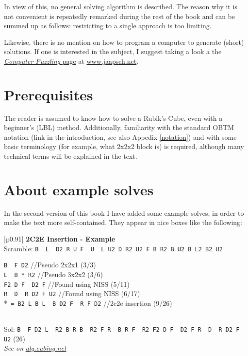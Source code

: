 \documentclass[11pt,a4paper]{book}
\newcommand{\p}{\textquotesingle}
\newcommand{\m}{\texttt}
\newcommand{\ps}{\p\,\,}
\newcommand{\comment}[1]{{\color{gray}\quad//#1}}
\begin{document}
In view of this, no general solving algorithm is described. The reason why it is not convenient is repeatedly remarked during the rest of the book and can be summed up as follows: restricting to a single approach is too limiting.

Likewise, there is no mention on how to program a computer to generate (short) solutions. If one is interested in the subject, I suggest taking a look a the \href{https://www.jaapsch.net/puzzles/compcube.htm}{\emph{Computer Puzzling} page} at \url{www.jaapsch.net}.

\section*{Prerequisites}

The reader is assumed to know how to solve a Rubik's Cube, even with a beginner's (LBL) method. Additionally, familiarity with the standard OBTM notation (link in the introduction, see also Appedix \ref{notation}) and with some basic terminology (for example, what 2x2x2 block is) is required, although many technical terms will be explained in the text.

\section*{About example solves}

In the second version of this book I have added some example solves, in order to make the text more self-contained. They appear in nice boxes like the following:

\bigskip
\begin{tabular}{|p{}|}
\hline
\textbf{2C2E Insertion - Example}\\
\hline
Scramble: \m{B\ps L\ps D2 R U F\ps U\ps L U2 D R2 U2 F B R2 B U2 B L2 B2 U2}\\
\hline
\begin{minipage}[l]{0.650\textwidth}
\m{B\ps F D2} \comment{Pseudo 2x2x1 (3/3)}\\
\m{L\ps B * R2} \comment{Pseudo 3x2x2 (3/6)}\\
\m{F2 D F\ps D2 F} \comment{Found using NISS (5/11)}\\
\m{R\ps D\ps R D2 F U2} \comment{Found using NISS (6/17)}\\
*\m{ = B2 L B L\ps B D2 F\ps R F D2} \comment{2c2e insertion (9/26)}
\end{minipage}
\begin{minipage}[c]{0.25\textwidth}

\end{minipage}\\
\hline
Sol: \m{B\ps F D2 L\ps R2 B R B\ps R2 F R\ps B R F\ps R2 F2 D F\ps D2 F R\ps D\ps R D2 F U2} (26)\\
\hline
\emph{See on }\href{https://alg.cubing.net/?setup=B-_L-_D2_R_U_F-_U-_L_U2_D_R2_U2_F_B_R2_B_U2_B_L2_B2_U2&alg=B-_F_D2_\%2F\%2FPseudo_2x2x1_(3\%2F3)\%0AL-_B_(B2_L_B_L-_B_D2_F-_R_F_D2)_R2_\%2F\%2FPseudo_3x2x2_(3\%2F6)\%0AF2_D_F-_D2_F_\%2F\%2FFound_using_NISS_(5\%2F11)\%0AR-_D-_R_D2_F_U2_\%2F\%2FFound_using_NISS_(6\%2F17)}{\emph{alg.cubing.net}}\\
\hline
\end{tabular}
\bigskip
\end{document}
